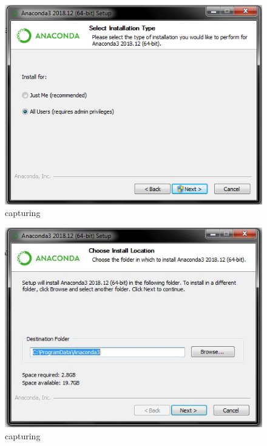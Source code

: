 \begin{enumerate}
\begin{itemize}
\begin{enumerate}
\begin{figure}[ht]
\centering
\includegraphics[scale=0.5]{figures/3.png}
\caption{capturing}
\label{proses instalasi}
\end{figure}

\begin{figure}[ht]
\centering
\includegraphics[scale=0.5]{figures/4.jpg}
\caption{capturing}
\label{proses instalasi}
\end{figure}


\end{enumerate}
\end{itemize}
\end{enumerate}
